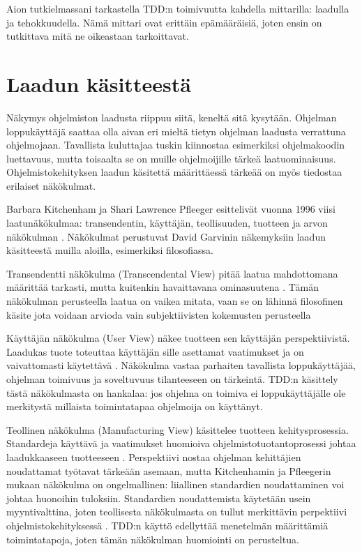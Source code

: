 \documentclass[finnish]{tktltiki2}
\theoremstyle{definition}
\theoremstyle{remark}
\begin{document}
Aion tutkielmassani tarkastella TDD:n toimivuutta kahdella mittarilla: laadulla ja tehokkuudella. Nämä mittari ovat erittäin epämääräisiä, joten ensin on tutkittava mitä ne oikeastaan tarkoittavat.


\section{Laadun käsitteestä}

Näkymys ohjelmiston laadusta riippuu siitä, keneltä sitä kysytään. Ohjelman loppukäyttäjä saattaa olla aivan eri mieltä tietyn ohjelman laadusta verrattuna ohjelmojaan. Tavallista kuluttajaa tuskin kiinnostaa esimerkiksi ohjelmakoodin luettavuus, mutta toisaalta se on muille ohjelmoijille tärkeä laatuominaisuus. Ohjelmistokehityksen laadun käsitettä määrittäessä tärkeää on myös tiedostaa erilaiset näkökulmat.

Barbara Kitchenham ja Shari Lawrence Pfleeger esittelivät vuonna 1996 viisi laatunäkökulmaa: transendentin, käyttäjän, teollisuuden, tuotteen ja arvon näkökulman \cite{Kitchenham96}. Näkökulmat perustuvat David Garvinin näkemyksiin laadun käsitteestä muilla aloilla, esimerkiksi filosofiassa.

Transendentti näkökulma (Transcendental View) pitää laatua mahdottomana määrittää tarkasti, mutta kuitenkin havaittavana ominasuutena \cite{Kitchenham96}. Tämän näkökulman perusteella laatua on vaikea mitata, vaan se on lähinnä filosofinen käsite jota voidaan arvioda vain subjektiivisten kokemusten perusteella

Käyttäjän näkökulma (User View) näkee tuotteen sen käyttäjän perspektiivistä. Laadukas tuote toteuttaa käyttäjän sille asettamat vaatimukset ja on vaivattomasti käytettävä \cite{Kitchenham96}. Näkökulma vastaa parhaiten tavallista loppukäyttäjää, ohjelman toimivuus ja soveltuvuus tilanteeseen on tärkeintä. TDD:n käsittely tästä näkökulmasta on hankalaa: jos ohjelma on toimiva ei loppukäyttäjälle ole merkitystä millaista toimintatapaa ohjelmoija on käyttänyt.

Teollinen näkökulma (Manufacturing View) käsittelee tuotteen kehitysprosessia. Standardeja käyttävä ja vaatimukset huomioiva ohjelmistotuotantoprosessi johtaa laadukkaaseen tuotteeseen \cite{Kitchenham96}. Perspektiivi nostaa ohjelman kehittäjien noudattamat työtavat tärkeään asemaan, mutta Kitchenhamin ja Pfleegerin mukaan näkökulma on ongelmallinen: liiallinen standardien noudattaminen voi johtaa huonoihin tuloksiin. Standardien noudattemista käytetään usein myyntivalttina, joten teollisesta näkökulmasta on tullut merkittävin perpektiivi ohjelmistokehityksessä \cite{Cote07}. TDD:n käyttö edellyttää menetelmän määrittämiä toimintatapoja, joten tämän näkökulman huomiointi on perusteltua. 
\end{document}
